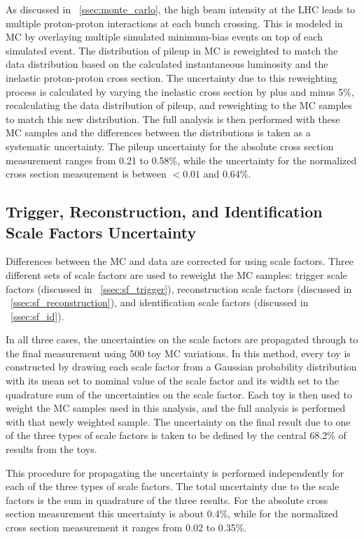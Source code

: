 As discussed in \SEC~\ref{ssec:monte_carlo}, the high beam intensity at the LHC
leads to multiple proton-proton interactions at each bunch crossing. This is
modeled in MC by overlaying multiple simulated minimum-bias events on top of
each simulated event. The distribution of pileup in MC is reweighted to match
the data distribution based on the calculated instantaneous luminosity and the
inelastic proton-proton cross section. The uncertainty due to this reweighting
process is calculated by varying the inelastic cross section by plus and minus
5\%, recalculating the data distribution of pileup, and reweighting to the MC
samples to match this new distribution. The full analysis is then performed
with these MC samples and the differences between the \phistar distributions is
taken as a systematic uncertainty. The pileup uncertainty for the absolute
cross section measurement ranges from 0.21 to 0.58\%, while the uncertainty for
the normalized cross section measurement is between $< 0.01$ and 0.64\%.

\subsection{Trigger, Reconstruction, and Identification Scale Factors Uncertainty}
\label{scale_factor_uncertainty}

Differences between the MC and data are corrected for using scale factors.
Three different sets of scale factors are used to reweight the MC samples:
trigger scale factors (discussed in \SEC~\ref{ssec:sf_trigger}), reconstruction
scale factors (discussed in \SEC~\ref{ssec:sf_reconstruction}), and
identification scale factors (discussed in \SEC~\ref{ssec:sf_id}).

In all three cases, the uncertainties on the scale factors are propagated
through to the final measurement using 500 toy MC variations. In this method,
every toy is constructed by drawing each scale factor from a Gaussian
probability distribution with its mean set to nominal value of the scale factor
and its width set to the quadrature sum of the uncertainties on the scale
factor. Each toy is then used to weight the MC samples used in this analysis,
and the full analysis is performed with that newly weighted sample. The
uncertainty on the final result due to one of the three types of scale factors
is taken to be defined by the central 68.2\% of results from the toys.

This procedure for propagating the uncertainty is performed independently for
each of the three types of scale factors. The total uncertainty due to the
scale factors is the sum in quadrature of the three results. For the absolute
cross section measurement this uncertainty is about 0.4\%, while for the
normalized cross section measurement it ranges from 0.02 to 0.35\%.


